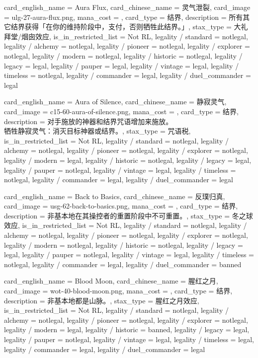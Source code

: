 \documentclass[lang = cn, color = black, 10pt]{AllThatStax}
\begin{document}
\card
{
	card_english_name = {Aura Flux},
	card_chinese_name = {灵气泄裂},
	card_image = ulg-27-aura-flux.png,
	mana_cost = ,
	card_type = 结界,
	description = {所有其它结界获得「在你的维持阶段中，支付，否则牺牲此结界。」},
	stax_type = 大礼拜堂/烟囱效应,
	is_in_restricted_list = Not RL,
	legality / standard = notlegal,
	legality / alchemy = notlegal,
	legality / pioneer = notlegal,
	legality / explorer = notlegal,
	legality / modern = notlegal,
	legality / historic = notlegal,
	legality / legacy = legal,
	legality / pauper = legal,
	legality / vintage = legal,
	legality / timeless = notlegal,
	legality / commander = legal,
	legality / duel_commander = legal
}

\card
{
	card_english_name = {Aura of Silence},
	card_chinese_name = {静寂灵气},
	card_image = c15-60-aura-of-silence.png,
	mana_cost = ,
	card_type = 结界,
	description = {对手施放的神器和结界咒语增加来施放。\\
牺牲静寂灵气：消灭目标神器或结界。},
	stax_type = 咒语税,
	is_in_restricted_list = Not RL,
	legality / standard = notlegal,
	legality / alchemy = notlegal,
	legality / pioneer = notlegal,
	legality / explorer = notlegal,
	legality / modern = legal,
	legality / historic = notlegal,
	legality / legacy = legal,
	legality / pauper = notlegal,
	legality / vintage = legal,
	legality / timeless = notlegal,
	legality / commander = legal,
	legality / duel_commander = legal
}

\card
{
	card_english_name = {Back to Basics},
	card_chinese_name = {反璞归真},
	card_image = usg-62-back-to-basics.png,
	mana_cost = ,
	card_type = 结界,
	description = {非基本地在其操控者的重置阶段中不可重置。},
	stax_type = 冬之球效应,
	is_in_restricted_list = Not RL,
	legality / standard = notlegal,
	legality / alchemy = notlegal,
	legality / pioneer = notlegal,
	legality / explorer = notlegal,
	legality / modern = notlegal,
	legality / historic = notlegal,
	legality / legacy = legal,
	legality / pauper = notlegal,
	legality / vintage = legal,
	legality / timeless = notlegal,
	legality / commander = legal,
	legality / duel_commander = banned
}

\card
{
	card_english_name = {Blood Moon},
	card_chinese_name = {腥红之月},
	card_image = wot-40-blood-moon.png,
	mana_cost = ,
	card_type = 结界,
	description = {非基本地都是山脉。},
	stax_type = 腥红之月效应,
	is_in_restricted_list = Not RL,
	legality / standard = notlegal,
	legality / alchemy = notlegal,
	legality / pioneer = notlegal,
	legality / explorer = notlegal,
	legality / modern = legal,
	legality / historic = banned,
	legality / legacy = legal,
	legality / pauper = notlegal,
	legality / vintage = legal,
	legality / timeless = legal,
	legality / commander = legal,
	legality / duel_commander = legal
}
\end{document}
